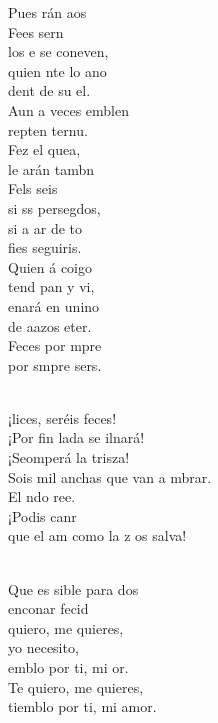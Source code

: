 \begin{cancion}
	Pues rán aos\\
\jump
	Fees sern\\
	los e se coneven,\\
	quien nte lo ano\\
	dent de su el.\\
	Aun a veces emblen\\
	repten ternu.\\
	Fez el quea,\\
	le arán tambn\\
\jump
	Fels seis \\
	si ss persegdos,\\
	si a ar de to\\
	fies seguiris.\\
	Quien á coigo\\
	tend pan y vi,  \\
	enará en unino\\
	de aazos eter.\\
	Feces por mpre\\
	por smpre sers.\\\jump\\
	\begin{chorus}%
	¡lices, seréis feces! \\
	¡Por fin lada se ilnará!\\
	¡Seomperá la trisza!\\
	Sois mil anchas que van a mbrar.\\
	El ndo ree.\\
	¡Podis canr\\
	que el am como la z os salva!\\
	\end{chorus}%
	\jump\\
	Que es sible para dos \\
	enconar fecid\\
	quiero, me quieres,\\
	yo  necesito,\\
	emblo por ti, mi or.\\
Te quiero, me quieres,\\
tiemblo por ti, mi amor.\\
\end{cancion}%

